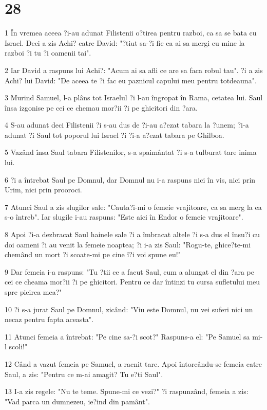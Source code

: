 \chapter{28}

\par 1 În vremea aceea ?i-au adunat Filistenii o?tirea pentru razboi, ca sa se bata cu Israel. Deci a zis Achi? catre David: "?tiut sa-?i fie ca ai sa mergi cu mine la razboi ?i tu ?i oamenii tai".
\par 2 Iar David a raspuns lui Achi?: "Acum ai sa afli ce are sa faca robul tau". ?i a zis Achi? lui David: "De aceea te ?i fac eu paznicul capului meu pentru totdeauna".
\par 3 Murind Samuel, l-a plâns tot Israelul ?i l-au îngropat în Rama, cetatea lui. Saul însa izgonise pe cei ce chemau mor?ii ?i pe ghicitori din ?ara.
\par 4 S-au adunat deci Filistenii ?i s-au dus de ?i-au a?ezat tabara la ?unem; ?i-a adunat ?i Saul tot poporul lui Israel ?i ?i-a a?ezat tabara pe Ghilboa.
\par 5 Vazând însa Saul tabara Filistenilor, s-a spaimântat ?i s-a tulburat tare inima lui.
\par 6 ?i a întrebat Saul pe Domnul, dar Domnul nu i-a raspuns nici în vis, nici prin Urim, nici prin prooroci.
\par 7 Atunci Saul a zis slugilor sale: "Cauta?i-mi o femeie vrajitoare, ca sa merg la ea s-o întreb". Iar slugile i-au raspuns: "Este aici în Endor o femeie vrajitoare".
\par 8 Apoi ?i-a dezbracat Saul hainele sale ?i a îmbracat altele ?i s-a dus el însu?i cu doi oameni ?i au venit la femeie noaptea; ?i i-a zis Saul: "Rogu-te, ghice?te-mi chemând un mort ?i scoate-mi pe cine î?i voi spune eu!"
\par 9 Dar femeia i-a raspuns: "Tu ?tii ce a facut Saul, cum a alungat el din ?ara pe cei ce cheama mor?ii ?i pe ghicitori. Pentru ce dar întinzi tu cursa sufletului meu spre pieirea mea?"
\par 10 ?i s-a jurat Saul pe Domnul, zicând: "Viu este Domnul, nu vei suferi nici un necaz pentru fapta aceasta".
\par 11 Atunci femeia a întrebat: "Pe cine sa-?i scot?" Raspuns-a el: "Pe Samuel sa mi-l scoli!"
\par 12 Când a vazut femeia pe Samuel, a racnit tare. Apoi întorcându-se femeia catre Saul, a zis: "Pentru ce m-ai amagit? Tu e?ti Saul".
\par 13 I-a zis regele: "Nu te teme. Spune-mi ce vezi?" ?i raspunzând, femeia a zis: "Vad parca un dumnezeu, ie?ind din pamânt".
